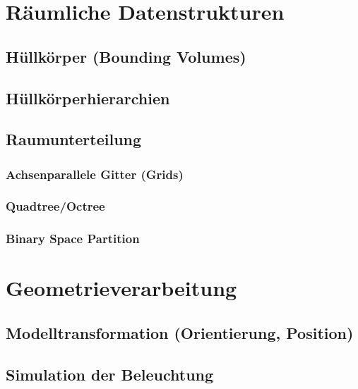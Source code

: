 \documentclass[a4paper, 11pt, accentcolor = tud3b]{tudreport}
\begin{document}
		\section{Räumliche Datenstrukturen} %

			\subsection{Hüllkörper (Bounding Volumes)} %

			\subsection{Hüllkörperhierarchien} %

			\subsection{Raumunterteilung} %

				\subsubsection{Achsenparallele Gitter (Grids)} %

				\subsubsection{Quadtree/Octree} %

				\subsubsection{Binary Space Partition} %

		\section{Geometrieverarbeitung} %

			\subsection{Modelltransformation (Orientierung, Position)} %

			\subsection{Simulation der Beleuchtung} %
\end{document}
